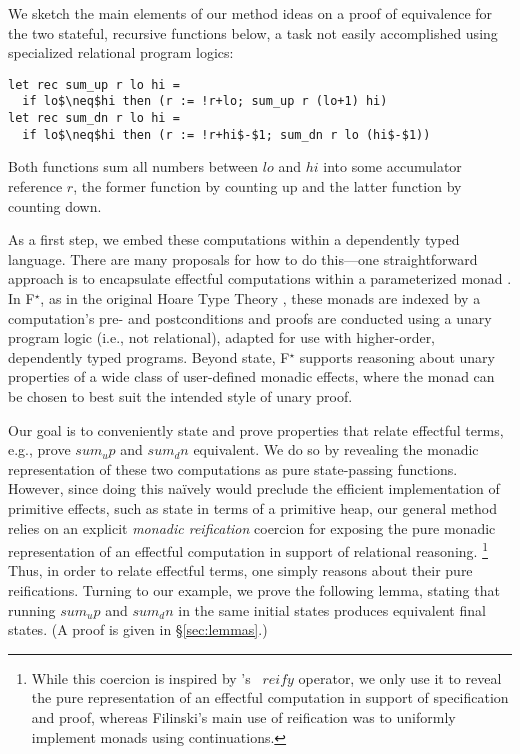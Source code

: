 \documentclass[sigplan,screen]{acmart}\settopmatter{}
\newcommand\citepos[1]{\citeauthor{#1}'s\ \citeyear{#1}}
\newcommand\fstar{F$^\star$\xspace}
\newcommand*{\IE}{i.e.,\xspace}
\begin{document}
We sketch the main \iffull elements of our method \else ideas \fi
on a proof of equivalence for
the two stateful, recursive functions below, a task not easily
accomplished using specialized relational program logics:

\begin{lstlisting}
let rec sum_up r lo hi = 
  if lo$\neq$hi then (r := !r+lo; sum_up r (lo+1) hi)
let rec sum_dn r lo hi = 
  if lo$\neq$hi then (r := !r+hi$-$1; sum_dn r lo (hi$-$1))
\end{lstlisting}
%
Both functions sum all numbers between \ls$lo$ and \ls$hi$ into some
accumulator reference \ls$r$, the former function by counting up and the latter
function by counting down.

As a first step, we embed these computations within a
dependently typed language. There are many proposals for how to
do this---one straightforward approach is to encapsulate effectful
computations within a parameterized monad \cite{atkey09parameterised}.
In \fstar, as in the original Hoare Type Theory \citep{nmb08htt}, these monads are
indexed by a computation's pre- and postconditions and proofs are
conducted using a unary program logic (\IE not relational), adapted for use with
higher-order, dependently typed programs.
%
Beyond state, \fstar supports reasoning about unary properties of a
wide class of user-defined monadic effects, where the monad can be
chosen to best suit the intended style of unary proof.

 Our goal is
to conveniently state and prove properties that relate
effectful terms, e.g., prove \ls$sum_up$ and \ls$sum_dn$
equivalent.
%
We do so by revealing the monadic representation of these two
computations as pure state-passing functions.
%
However, since doing this na\"ively would preclude the efficient
implementation of primitive effects, such as state in terms of a
primitive heap, our general method relies on an explicit {\em monadic
reification} coercion for exposing the pure monadic representation of
an effectful computation in support of relational reasoning.%
%
\footnote{While this coercion is inspired by \citepos{Filinski94}
  \ls$reify$ operator, we only use it to reveal the pure
  representation of an effectful computation in support of
  specification and proof, whereas Filinski's main use of reification
  was to uniformly implement monads using continuations.}
Thus, in order to relate effectful terms, one simply reasons about
their pure reifications.
%
Turning to our example, we prove the following lemma,
stating that running \ls$sum_up$
and \ls$sum_dn$ in the same initial states produces equivalent final
states. (A proof is given in \S\ref{sec:lemmas}.)
\end{document}
